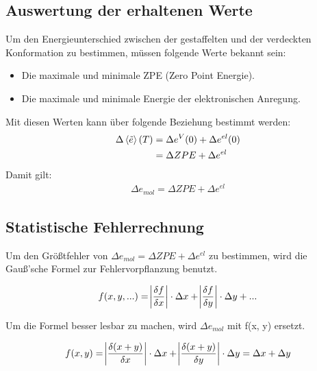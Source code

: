 \subsection{Auswertung der erhaltenen Werte}
Um den Energieunterschied zwischen der gestaffelten und der verdeckten Konformation zu bestimmen, müssen folgende Werte bekannt sein:
\begin{itemize}
    \item Die maximale und minimale ZPE (Zero Point Energie).
    \item Die maximale und minimale Energie der elektronischen Anregung.
\end{itemize}
Mit diesen Werten kann über folgende Beziehung bestimmt werden:
\begin{align*}
    \Delta \braket{\tilde{e}}(T) &= \Delta e^V (0) + \Delta e^{el} (0) \\
                                 &= \Delta ZPE + \Delta e^{el}   
\end{align*} 
Damit gilt:
\begin{align}
    \Delta e_{mol} = \Delta ZPE + \Delta e^{el} 
\end{align}


\subsection{Statistische Fehlerrechnung}

Um den Größtfehler von $\Delta e_{mol} = \Delta ZPE + \Delta e^{el} $ zu bestimmen, wird die Gauß'sche Formel zur Fehlervorpflanzung benutzt.

\begin{align}
    f(x, y, ...) = \abs{\frac{\delta f}{\delta x}} \cdot \Delta x + \abs{\frac{\delta f}{\delta y}} \cdot \Delta y + ...
\end{align}

Um die Formel besser lesbar zu machen, wird $\Delta e_{mol}$ mit f(x, y) ersetzt.

\begin{align*}
    f(x, y) =  \abs{\frac{\delta (x + y)}{\delta x}} \cdot \Delta x + \abs{\frac{\delta (x + y)}{\delta y}} \cdot \Delta y = \Delta x + \Delta y
\end{align*}

